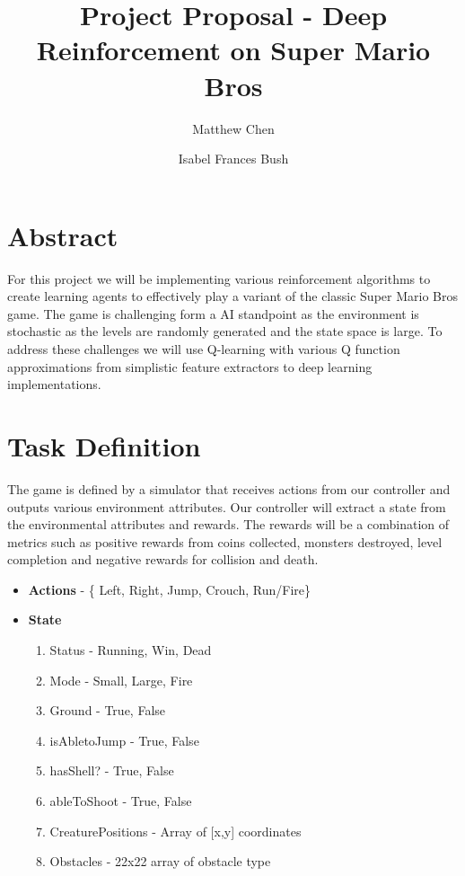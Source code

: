 \documentclass[12pt]{article}
\begin{document}
\nocite{*}

\title{Project Proposal - Deep Reinforcement on Super Mario Bros}

\author{
  Matthew Chen
  \and
  Isabel Frances Bush
}
\date{}
\maketitle


\section{Abstract}

For this project we will be implementing various reinforcement algorithms to create learning agents to effectively play a variant of the classic Super Mario Bros game. The game is challenging form a AI standpoint as the environment is stochastic as the levels are randomly generated and the state space is large. To address these challenges we will use Q-learning with various Q function approximations from simplistic feature extractors to deep learning implementations.

\section{Task Definition}

The game is defined by a simulator that receives actions from our controller and outputs various environment attributes. Our controller will extract a state from the environmental attributes and rewards. The rewards will be a combination of metrics such as positive rewards from coins collected, monsters destroyed, level completion and negative rewards for collision and death.

\begin{itemize}
\item[] \textbf{Actions} - \{ Left, Right, Jump, Crouch, Run/Fire\}
\item[] \textbf{State}
\begin{enumerate}
\item[] Status - Running, Win, Dead
\item[] Mode - Small, Large, Fire
\item[] Ground - True, False
\item[] isAbletoJump - True, False
\item[] hasShell? - True, False
\item[] ableToShoot - True, False
\item[] CreaturePositions - Array of [x,y] coordinates
\item[] Obstacles - 22x22 array of obstacle type
\end{enumerate}
\end{itemize}
\end{document}
